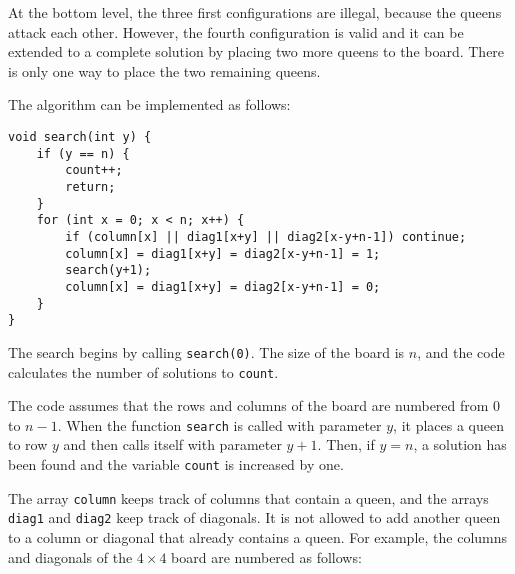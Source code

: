 At the bottom level, the three first configurations
are illegal, because the queens attack each other.
However, the fourth configuration is valid
and it can be extended to a complete solution by
placing two more queens to the board.
There is only one way to place the two remaining queens.

\begin{samepage}
The algorithm can be implemented as follows:
\begin{lstlisting}
void search(int y) {
    if (y == n) {
        count++;
        return;
    }
    for (int x = 0; x < n; x++) {
        if (column[x] || diag1[x+y] || diag2[x-y+n-1]) continue;
        column[x] = diag1[x+y] = diag2[x-y+n-1] = 1;
        search(y+1);
        column[x] = diag1[x+y] = diag2[x-y+n-1] = 0;
    }
}
\end{lstlisting}
\end{samepage}
The search begins by calling \texttt{search(0)}.
The size of the board is $n$,
and the code calculates the number of solutions
to \texttt{count}.

The code assumes that the rows and columns
of the board are numbered from 0 to $n-1$.
When the function \texttt{search} is
called with parameter $y$,
it places a queen to row $y$
and then calls itself with parameter $y+1$.
Then, if $y=n$, a solution has been found
and the variable \texttt{count} is increased by one.

The array \texttt{column} keeps track of columns
that contain a queen,
and the arrays \texttt{diag1} and \texttt{diag2}
keep track of diagonals.
It is not allowed to add another queen to a
column or diagonal that already contains a queen. 
For example, the columns and diagonals of
the $4 \times 4$ board are numbered as follows:

